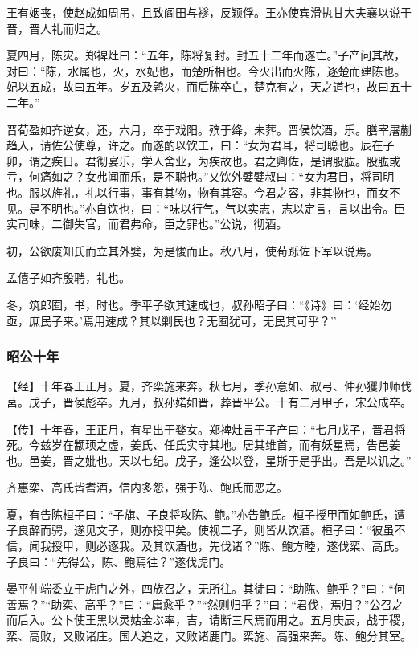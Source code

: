 \documentclass[]{article}
\begin{document}
王有姻丧，使赵成如周吊，且致阎田与襚，反颖俘。王亦使宾滑执甘大夫襄以说于晋，晋人礼而归之。

夏四月，陈灾。郑裨灶曰：``五年，陈将复封。封五十二年而遂亡。''子产问其故，对曰：``陈，水属也，火，水妃也，而楚所相也。今火出而火陈，逐楚而建陈也。妃以五成，故曰五年。岁五及鹑火，而后陈卒亡，楚克有之，天之道也，故曰五十二年。''

晋荀盈如齐逆女，还，六月，卒于戏阳。殡于绛，未葬。晋侯饮酒，乐。膳宰屠蒯趋入，请佐公使尊，许之。而遂酌以饮工，曰：``女为君耳，将司聪也。辰在子卯，谓之疾日。君彻宴乐，学人舍业，为疾故也。君之卿佐，是谓股肱。股肱或亏，何痛如之？女弗闻而乐，是不聪也。''又饮外嬖嬖叔曰：``女为君目，将司明也。服以旌礼，礼以行事，事有其物，物有其容。今君之容，非其物也，而女不见。是不明也。''亦自饮也，曰：``味以行气，气以实志，志以定言，言以出令。臣实司味，二御失官，而君弗命，臣之罪也。''公说，彻酒。

初，公欲废知氏而立其外嬖，为是悛而止。秋八月，使荀跞佐下军以说焉。

孟僖子如齐殷聘，礼也。

冬，筑郎囿，书，时也。季平子欲其速成也，叔孙昭子曰：``《诗》曰：`经始勿亟，庶民子来。'焉用速成？其以剿民也？无囿犹可，无民其可乎？''

\hypertarget{header-n2527}{%
\subsubsection{昭公十年}\label{header-n2527}}

【经】十年春王正月。夏，齐栾施来奔。秋七月，季孙意如、叔弓、仲孙玃帅师伐莒。戊子，晋侯彪卒。九月，叔孙婼如晋，葬晋平公。十有二月甲子，宋公成卒。

【传】十年春，王正月，有星出于婺女。郑裨灶言于子产曰：``七月戊子，晋君将死。今兹岁在颛顼之虚，姜氏、任氏实守其地。居其维首，而有妖星焉，告邑姜也。邑姜，晋之妣也。天以七纪。戊子，逢公以登，星斯于是乎出。吾是以讥之。''

齐惠栾、高氏皆耆酒，信内多怨，强于陈、鲍氏而恶之。

夏，有告陈桓子曰：``子旗、子良将攻陈、鲍。''亦告鲍氏。桓子授甲而如鲍氏，遭子良醉而骋，遂见文子，则亦授甲矣。使视二子，则皆从饮酒。桓子曰：``彼虽不信，闻我授甲，则必逐我。及其饮酒也，先伐诸？''陈、鲍方睦，遂伐栾、高氏。子良曰：``先得公，陈、鲍焉往？''遂伐虎门。

晏平仲端委立于虎门之外，四族召之，无所往。其徒曰：``助陈、鲍乎？''曰：``何善焉？''``助栾、高乎？''曰：``庸愈乎？''``然则归乎？''曰：``君伐，焉归？''公召之而后入。公卜使王黑以灵姑金ぶ率，吉，请断三尺焉而用之。五月庚辰，战于稷，栾、高败，又败诸庄。国人追之，又败诸鹿门。栾施、高强来奔。陈、鲍分其室。
\end{document}
